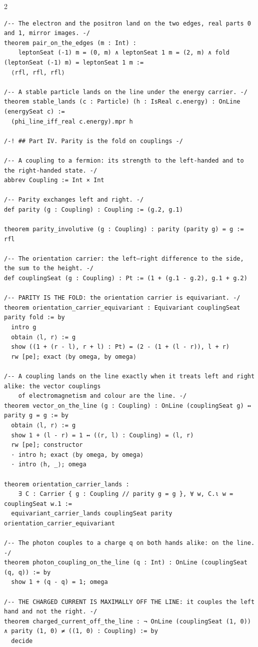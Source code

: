 \documentclass[10pt]{article}
\begin{document}
\begin{multicols}{2}
\begin{Verbatim}[fontsize=\fontsize{6.2}{7.2}\selectfont,breaklines,breakanywhere,breaksymbolleft={}]
/-- The electron and the positron land on the two edges, real parts 0 and 1, mirror images. -/
theorem pair_on_the_edges (m : Int) :
    leptonSeat (-1) m = (0, m) ∧ leptonSeat 1 m = (2, m) ∧ fold (leptonSeat (-1) m) = leptonSeat 1 m :=
  ⟨rfl, rfl, rfl⟩

/-- A stable particle lands on the line under the energy carrier. -/
theorem stable_lands (c : Particle) (h : IsReal c.energy) : OnLine (energySeat c) :=
  (phi_line_iff_real c.energy).mpr h

/-! ## Part IV. Parity is the fold on couplings -/

/-- A coupling to a fermion: its strength to the left-handed and to the right-handed state. -/
abbrev Coupling := Int × Int

/-- Parity exchanges left and right. -/
def parity (g : Coupling) : Coupling := (g.2, g.1)

theorem parity_involutive (g : Coupling) : parity (parity g) = g := rfl

/-- The orientation carrier: the left–right difference to the side, the sum to the height. -/
def couplingSeat (g : Coupling) : Pt := (1 + (g.1 - g.2), g.1 + g.2)

/-- PARITY IS THE FOLD: the orientation carrier is equivariant. -/
theorem orientation_carrier_equivariant : Equivariant couplingSeat parity fold := by
  intro g
  obtain ⟨l, r⟩ := g
  show ((1 + (r - l), r + l) : Pt) = (2 - (1 + (l - r)), l + r)
  rw [pe]; exact ⟨by omega, by omega⟩

/-- A coupling lands on the line exactly when it treats left and right alike: the vector couplings
    of electromagnetism and colour are the line. -/
theorem vector_on_the_line (g : Coupling) : OnLine (couplingSeat g) ↔ parity g = g := by
  obtain ⟨l, r⟩ := g
  show 1 + (l - r) = 1 ↔ ((r, l) : Coupling) = (l, r)
  rw [pe]; constructor
  · intro h; exact ⟨by omega, by omega⟩
  · intro ⟨h, _⟩; omega

theorem orientation_carrier_lands :
    ∃ C : Carrier { g : Coupling // parity g = g }, ∀ w, C.ι w = couplingSeat w.1 :=
  equivariant_carrier_lands couplingSeat parity orientation_carrier_equivariant

/-- The photon couples to a charge q on both hands alike: on the line. -/
theorem photon_coupling_on_the_line (q : Int) : OnLine (couplingSeat (q, q)) := by
  show 1 + (q - q) = 1; omega

/-- THE CHARGED CURRENT IS MAXIMALLY OFF THE LINE: it couples the left hand and not the right. -/
theorem charged_current_off_the_line : ¬ OnLine (couplingSeat (1, 0)) ∧ parity (1, 0) ≠ ((1, 0) : Coupling) := by
  decide


\end{Verbatim}
\end{multicols}
\end{document}
